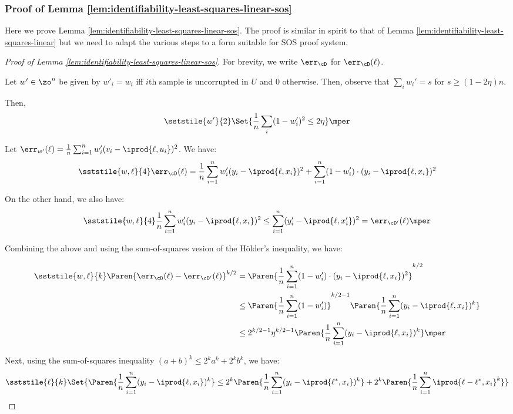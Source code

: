 \subsubsection{Proof of Lemma \ref{lem:identifiability-least-squares-linear-sos}}\label{sec:soscertification}
Here we prove Lemma \ref{lem:identifiability-least-squares-linear-sos}. The proof is similar in spirit to that of Lemma \ref{lem:identifiability-least-squares-linear} but we need to adapt the various steps to a form suitable for SOS proof system.
\begin{proof}[Proof of Lemma \ref{lem:identifiability-least-squares-linear-sos}]

For brevity, we write $\err_{\cD}$ for $\err_{\cD}(\ell)$.

Let $w' \in \zo^n$ be given by $w'_i = w_i$ iff $i$th sample is uncorrupted in $U$ and $0$ otherwise.
Then, observe that $\sum_i w_i' = s$ for $s \geq (1-2\eta)n.$ 

Then, 
\[
\sststile{w'}{2} \Set{ \frac{1}{n} \sum_i (1-w'_i)^2 \leq 2 \eta}\mper
\]

Let $\err_{w'}(\ell) = \frac{1}{n} \sum_{i = 1}^n w_i' (v_i - \iprod{\ell,u_i})^2$.
We have:%
\[
\sststile{w,\ell}{4} \err_{\cD}(\ell) = \frac{1}{n} \sum_{i = 1}^n w'_i (y_i-\iprod{\ell,x_i})^2 + \sum_{i = 1}^n (1-w'_i) \cdot (y_i-\iprod{\ell,x_i})^2
\]

On the other hand, we also have:
\[
\sststile{w,\ell}{4} \frac{1}{n} \sum_{i = 1}^n w'_i (y_i-\iprod{\ell,x_i})^2 \leq \sum_{i =1}^n (y_i' - \iprod{\ell,x'_i})^2 = \err_{\cD'}(\ell)\mper
\]

Combining the above and using the sum-of-squares vesion of the H\"older's inequality, we have:

\begin{align}
\sststile{w,\ell}{k} \Paren{\err_{\cD}(\ell) - \err_{\cD'}(\ell)}^{k/2} &= \Paren{\frac{1}{n} \sum_{i = 1}^n (1-w'_i) \cdot (y_i -\iprod{\ell,x_i})^2}^{k/2}\notag\\
&\leq \Paren{\frac{1}{n} \sum_{i = 1}^n (1-w'_i)}^{k/2-1} \Paren{ \frac{1}{n} \sum_{i =1}^n (y_i-\iprod{\ell,x_i})^{k}} \notag\\
&\leq 2^{k/2-1}\eta^{k/2-1} \Paren{ \frac{1}{n} \sum_{i =1}^n (y_i-\iprod{\ell,x_i})^{k}}  \label{eq:CS-bound}\mper
\end{align}

Next, using the sum-of-squares inequality $(a+b)^k \leq 2^k a^k + 2^k b^k$, we have:
\begin{equation}\label{eq:minkowski}
\sststile{\ell}{k} \Set{\Paren{ \frac{1}{n} \sum_{i =1}^n (y_i-\iprod{\ell,x_i})^{k}} \leq 2^{k} \Paren{ \frac{1}{n} \sum_{i =1}^n (y_i-\iprod{\ell^{*},x_i})^{k}} + 2^{k} \Paren{ \frac{1}{n} \sum_{i =1}^n \iprod{\ell-\ell^{*},x_i}^{k}} } 
\end{equation}


\end{proof}
